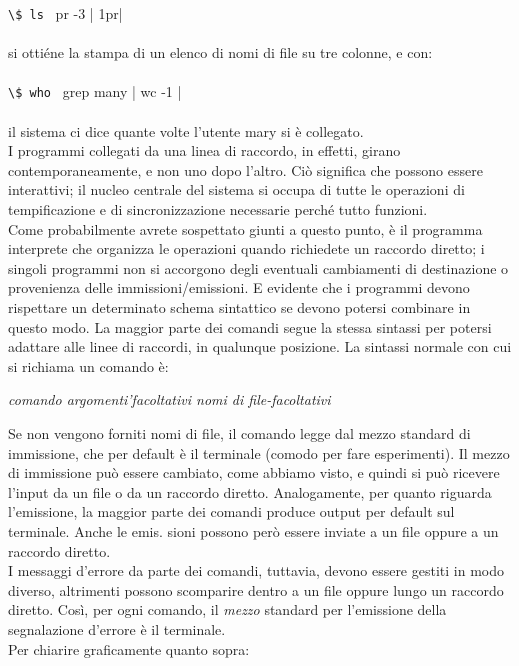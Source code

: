 \lstinline|\$ ls | pr -3 | 1pr|\\\\
si ottiéne la stampa di un elenco di nomi di file su tre colonne, e con:\\\\
\lstinline|\$ who | grep many | wc -1 |\\\\
il sistema ci dice quante volte l'utente mary si è collegato.\\
I programmi collegati da una linea di raccordo, in effetti, girano contemporaneamente, e non uno dopo l'altro. Ciò significa che possono essere interattivi; il nucleo
centrale del sistema si occupa di tutte le operazioni di tempificazione e di sincronizzazione necessarie perché tutto funzioni.\\
Come probabilmente avrete sospettato giunti a questo punto, è il programma interprete che organizza le operazioni quando richiedete un raccordo diretto; i singoli
programmi non si accorgono degli eventuali cambiamenti di destinazione o provenienza delle immissioni/emissioni. E evidente che i programmi devono rispettare un
determinato schema sintattico se devono potersi combinare in questo modo. La maggior parte dei comandi segue la stessa sintassi per potersi adattare alle linee di raccordi, in qualunque posizione. La sintassi normale con cui si richiama un comando è:
\begin{multicols}{2}
	{\it comando argomenti'facoltativi nomi di file-facoltativi}\\
\end{multicols}
Se non vengono forniti nomi di file, il comando legge dal mezzo standard di immissione, che per default è il terminale (comodo per fare esperimenti). Il mezzo di immissione può essere cambiato, come abbiamo visto, e quindi si può ricevere l'input da un
file o da un raccordo diretto. Analogamente, per quanto riguarda l'emissione, la
maggior parte dei comandi produce output per default sul terminale. Anche le emis.
sioni possono però essere inviate a un file oppure a un raccordo diretto.\\
I messaggi d'errore da parte dei comandi, tuttavia, devono essere gestiti in modo
diverso, altrimenti possono scomparire dentro a un file oppure lungo un raccordo diretto. Così, per ogni comando, il \textit{mezzo} standard per l'emissione della segnalazione d'errore è il terminale.\\
Per chiarire graficamente quanto sopra:
